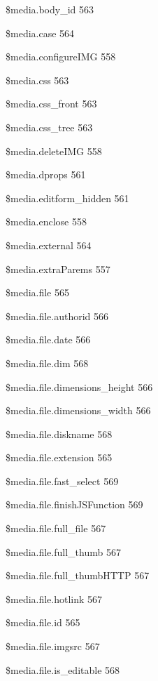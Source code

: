 \documentclass{book}
\renewcommand\subitem{\par}
\begin{document}
\begin{multicols}{2}
\begin{osp-index}
    \subitem \$media.body\_id\hspace{1mm} 563
    \subitem \$media.case\hspace{1mm} 564
    \subitem \$media.configureIMG\hspace{1mm} 558
    \subitem \$media.css\hspace{1mm} 563
    \subitem \$media.css\_front\hspace{1mm} 563
    \subitem \$media.css\_tree\hspace{1mm} 563
    \subitem \$media.deleteIMG\hspace{1mm} 558
    \subitem \$media.dprops\hspace{1mm} 561
    \subitem \$media.editform\_hidden\hspace{1mm} 561
    \subitem \$media.enclose\hspace{1mm} 558
    \subitem \$media.external\hspace{1mm} 564
    \subitem \$media.extraParems\hspace{1mm} 557
    \subitem \$media.file\hspace{1mm} 565
    \subitem \$media.file.authorid\hspace{1mm} 566
    \subitem \$media.file.date\hspace{1mm} 566
    \subitem \$media.file.dim\hspace{1mm} 568
    \subitem \$media.file.dimensions\_height\hspace{1mm} 566
    \subitem \$media.file.dimensions\_width\hspace{1mm} 566
    \subitem \$media.file.diskname\hspace{1mm} 568
    \subitem \$media.file.extension\hspace{1mm} 565
    \subitem \$media.file.fast\_select\hspace{1mm} 569
    \subitem \$media.file.finishJSFunction\hspace{1mm} 569
    \subitem \$media.file.full\_file\hspace{1mm} 567
    \subitem \$media.file.full\_thumb\hspace{1mm} 567
    \subitem \$media.file.full\_thumbHTTP\hspace{1mm} 567
    \subitem \$media.file.hotlink\hspace{1mm} 567
    \subitem \$media.file.id\hspace{1mm} 565
    \subitem \$media.file.imgsrc\hspace{1mm} 567
    \subitem \$media.file.is\_editable\hspace{1mm} 568

\end{osp-index}
\end{multicols}
\end{document}
